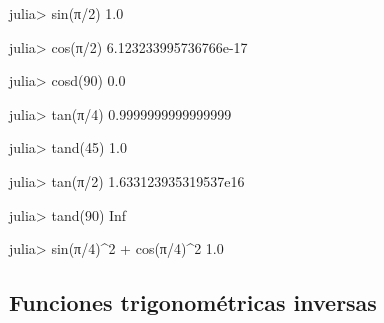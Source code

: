 \documentclass[
  letterpaper,
  DIV=11,
  numbers=noendperiod]{scrreprt}
\newenvironment{Shaded}{\begin{snugshade}}{\end{snugshade}}
\newcommand{\ConstantTok}[1]{\textcolor[rgb]{0.56,0.35,0.01}{#1}}
\newcommand{\FloatTok}[1]{\textcolor[rgb]{0.68,0.00,0.00}{#1}}
\newcommand{\FunctionTok}[1]{\textcolor[rgb]{0.28,0.35,0.67}{#1}}
\newcommand{\NormalTok}[1]{\textcolor[rgb]{0.00,0.23,0.31}{#1}}
\newcommand{\OperatorTok}[1]{\textcolor[rgb]{0.37,0.37,0.37}{#1}}
\begin{document}
\begin{Shaded}
\begin{Highlighting}[]
\NormalTok{julia}\OperatorTok{\textgreater{}} \FunctionTok{sin}\NormalTok{(}\ConstantTok{π}\OperatorTok{/}\FloatTok{2}\NormalTok{)}
\FloatTok{1.0}

\NormalTok{julia}\OperatorTok{\textgreater{}} \FunctionTok{cos}\NormalTok{(}\ConstantTok{π}\OperatorTok{/}\FloatTok{2}\NormalTok{)}
\FloatTok{6.123233995736766e{-}17}

\NormalTok{julia}\OperatorTok{\textgreater{}} \FunctionTok{cosd}\NormalTok{(}\FloatTok{90}\NormalTok{)}
\FloatTok{0.0}

\NormalTok{julia}\OperatorTok{\textgreater{}} \FunctionTok{tan}\NormalTok{(}\ConstantTok{π}\OperatorTok{/}\FloatTok{4}\NormalTok{)}
\FloatTok{0.9999999999999999}

\NormalTok{julia}\OperatorTok{\textgreater{}} \FunctionTok{tand}\NormalTok{(}\FloatTok{45}\NormalTok{)}
\FloatTok{1.0}

\NormalTok{julia}\OperatorTok{\textgreater{}} \FunctionTok{tan}\NormalTok{(}\ConstantTok{π}\OperatorTok{/}\FloatTok{2}\NormalTok{)}
\FloatTok{1.633123935319537e16}

\NormalTok{julia}\OperatorTok{\textgreater{}} \FunctionTok{tand}\NormalTok{(}\FloatTok{90}\NormalTok{)}
\ConstantTok{Inf}

\NormalTok{julia}\OperatorTok{\textgreater{}} \FunctionTok{sin}\NormalTok{(}\ConstantTok{π}\OperatorTok{/}\FloatTok{4}\NormalTok{)}\OperatorTok{\^{}}\FloatTok{2} \OperatorTok{+} \FunctionTok{cos}\NormalTok{(}\ConstantTok{π}\OperatorTok{/}\FloatTok{4}\NormalTok{)}\OperatorTok{\^{}}\FloatTok{2}
\FloatTok{1.0}
\end{Highlighting}
\end{Shaded}

\hypertarget{funciones-trigonomuxe9tricas-inversas}{%
\subsection{Funciones trigonométricas
inversas}\label{funciones-trigonomuxe9tricas-inversas}}
\end{document}
